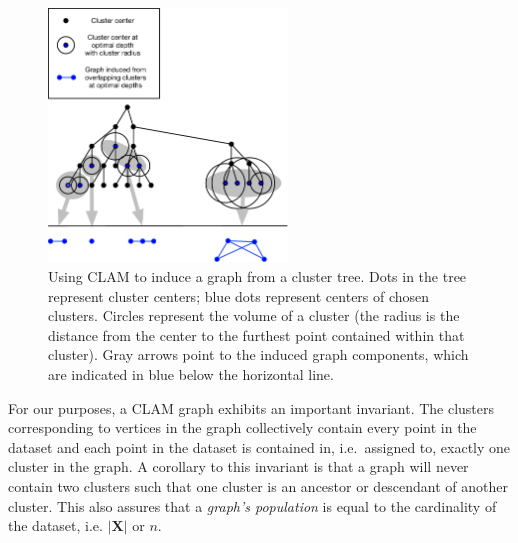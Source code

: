 \begin{figure}[ht!]
    \centering
    \includegraphics[width=2.5in]{images/tree-graph.pdf}
    \caption{Using CLAM to induce a graph from a cluster tree.
        Dots in the tree represent cluster centers;
        blue dots represent centers of chosen clusters.
        Circles represent the volume of a cluster (the radius is the distance from the center to the furthest point contained within that cluster).
        Gray arrows point to the induced graph components, which are indicated in blue below the horizontal line.}
    \label{fig:methods:graph-generation}
\end{figure}

For our purposes, a CLAM graph exhibits an important invariant.
The clusters corresponding to vertices in the graph collectively contain every point in the dataset and each point in the dataset is contained in, i.e.\ assigned to, exactly one cluster in the graph.
A corollary to this invariant is that a graph will never contain two clusters such that one cluster is an ancestor or descendant of another cluster.
This also assures that a \textit{graph's population} is equal to the cardinality of the dataset, i.e. $|\textbf{X}|$ or $n$.

